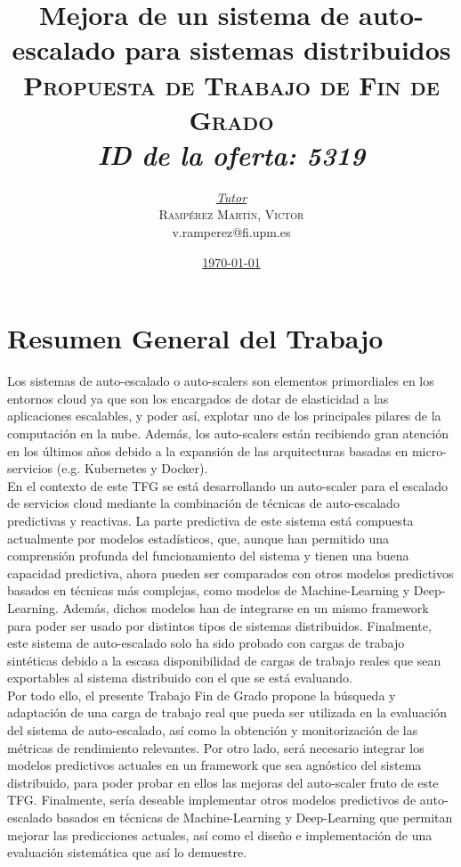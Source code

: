 \documentclass[12pt,a4paper, english]{article}
\title{
  \textbf{Mejora de un sistema de auto-escalado para sistemas distribuidos} \\[0.5cm]

  \textsc{Propuesta de Trabajo de Fin de Grado} \\[0.5cm]

  \emph{ID de la oferta: 5319}\\[1cm]
}
\author{
  \textit{\underline{Tutor}}\\[0.2cm]

  \textsc{Rampérez Martín, Victor}\\
  v.ramperez@fi.upm.es\\[0.2cm]

}
\date{
  \vfill\vfill\vfill
  \underline{\today}
}
\begin{document}
\clearpage\maketitle
\thispagestyle{empty}
\pagebreak
\section{Resumen General del Trabajo}

Los sistemas de auto-escalado o auto-scalers son elementos primordiales en los entornos cloud ya que son los encargados de dotar de elasticidad a las aplicaciones escalables, y poder así, explotar uno de los principales pilares de la computación en la nube. Además, los auto-scalers están recibiendo gran atención en los últimos años debido a la expansión de las arquitecturas basadas en micro-servicios (e.g. Kubernetes y Docker).\\

En el contexto de este TFG se está desarrollando un auto-scaler para el escalado de servicios cloud mediante la combinación de técnicas de auto-escalado predictivas y reactivas. La parte predictiva de este sistema está compuesta actualmente por modelos estadísticos, que, aunque han permitido una comprensión profunda del funcionamiento del sistema y tienen una buena capacidad predictiva, ahora pueden ser comparados con otros modelos predictivos basados en técnicas más complejas, como modelos de Machine-Learning y Deep-Learning. Además, dichos modelos han de integrarse en un mismo framework para poder ser usado por distintos tipos de sistemas distribuidos. Finalmente, este sistema de auto-escalado solo ha sido probado con cargas de trabajo sintéticas debido a la escasa disponibilidad de cargas de trabajo reales que sean exportables al sistema distribuido con el que se está evaluando.\\


Por todo ello, el presente Trabajo Fin de Grado propone la búsqueda y adaptación de una carga de trabajo real que pueda ser utilizada en la evaluación del sistema de auto-escalado, así como la obtención y monitorización de las métricas de rendimiento relevantes. Por otro lado, será necesario integrar los modelos predictivos actuales en un framework que sea agnóstico del sistema distribuido, para poder probar en ellos las mejoras del auto-scaler fruto de este TFG. Finalmente, sería deseable implementar otros modelos predictivos de auto-escalado basados en técnicas de Machine-Learning y Deep-Learning que permitan mejorar las predicciones actuales, así como el diseño e implementación de una evaluación sistemática que así lo demuestre.
\end{document}
